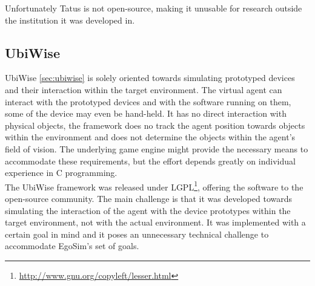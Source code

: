 
Unfortunately Tatus is not open-source, making it unusable for research outside the institution it was developed in.\\

\subsection{UbiWise}\label{subsec:discussion_ubiwise}
UbiWise \ref{sec:ubiwise} is solely oriented towards simulating prototyped devices and their interaction within the target environment. The virtual agent can interact with the prototyped devices and with the software running on them, some of the device may even be hand-held. It has no direct interaction with physical objects, the framework does no track the agent position towards objects within the environment and does not determine the objects within the agent's field of vision. The underlying game engine might provide the necessary means to accommodate these requirements, but the effort depends greatly on individual experience in C programming.\\

The UbiWise framework was released under LGPL\footnote{\url{http://www.gnu.org/copyleft/lesser.html}}, offering the software to the open-source community. The main challenge is that it was developed towards simulating the interaction of the agent with the device prototypes within the target environment, not with the actual environment. It was implemented with a certain goal in mind and it poses an unnecessary technical challenge to accommodate EgoSim's set of goals.\\
